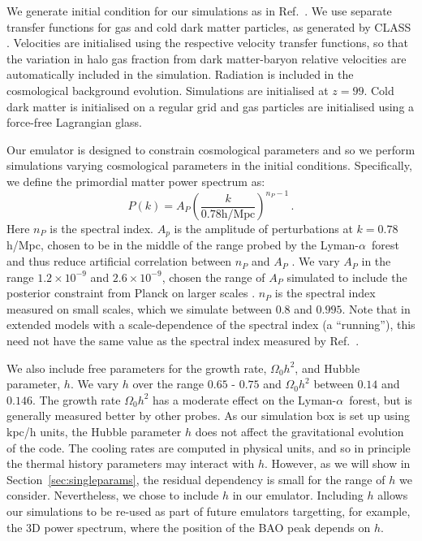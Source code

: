 \documentclass[a4paper,11pt]{article}
\newcommand{\Lya}{Lyman-$\alpha$}
\begin{document}
We generate initial condition for our simulations as in Ref.~\cite{Bird:2020}. We use separate transfer functions for gas and cold dark matter particles, as generated by CLASS \cite{CLASS}. Velocities are initialised using the respective velocity transfer functions, so that the variation in halo gas fraction from dark matter-baryon relative velocities are automatically included in the simulation. Radiation is included in the cosmological background evolution. Simulations are initialised at $z=99$. Cold dark matter is initialised on a regular grid and gas particles are initialised using a force-free Lagrangian glass.

Our emulator is designed to constrain cosmological parameters and so we perform simulations varying cosmological parameters in the initial conditions. Specifically, we define the primordial matter power spectrum as:
\begin{equation}
 P(k) = A_P \left(\frac{k}{ 0.78 \mathrm{h/Mpc}}\right)^{n_P-1}\,.
 \label{eq:pk}
\end{equation}
Here $n_P$ is the spectral index. $A_p$ is the amplitude of perturbations at $k = 0.78$ h/Mpc, chosen to be in the middle of the range probed by the \Lya~forest and thus reduce artificial correlation between $n_P$ and $A_P$ \cite{Bird:2019}. We vary $A_P$ in the range $1.2 \times 10^{-9}$ and $2.6 \times 10^{-9}$, chosen the range of $A_P$ simulated to include the posterior constraint from Planck on larger scales \cite{Planck:2018}.
$n_P$ is the spectral index measured on small scales, which we simulate between $0.8$ and $0.995$. Note that in extended models with a scale-dependence of the spectral index (a ``running''), this need not have the same value as the spectral index measured by Ref.~\cite{Planck:2018}.

We also include free parameters for the growth rate, $\Omega_0 h^2$, and Hubble parameter, $h$. We vary $h$ over the range $0.65$ - $0.75$ and $\Omega_0 h^2$ between $0.14$ and $0.146$. The growth rate $\Omega_0 h^2$ has a moderate effect on the \Lya~forest, but is generally measured better by other probes. As our simulation box is set up using kpc/h units, the Hubble parameter $h$ does not affect the gravitational evolution of the code. The cooling rates are computed in physical units, and so in principle the thermal history parameters may interact with $h$. However, as we will show in Section~\ref{sec:singleparams}, the residual dependency is small for the range of $h$ we consider. Nevertheless, we chose to include $h$ in our emulator. Including $h$ allows our simulations to be re-used as part of future emulators targetting, for example, the 3D power spectrum, where the position of the BAO peak depends on $h$.
\end{document}
